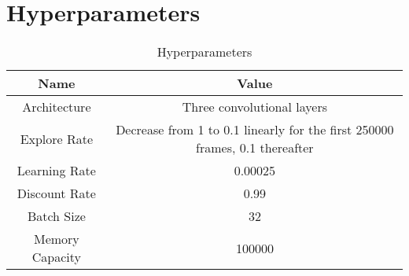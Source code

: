\section{Hyperparameters}
\begin{table}[h!]
\begin{center}
\begin{tabular}{ |c|c| } 
\hline
Name & Value \\
\hline
Architecture & Three convolutional layers\\
\hline
Explore Rate & Decrease from 1 to 0.1 linearly for the first 250000 frames, 0.1 thereafter\\
\hline
Learning Rate & 0.00025\\
\hline
Discount Rate & 0.99 \\
\hline
Batch Size & 32 \\
\hline
Memory Capacity & 100000 \\
\hline
\end{tabular}
\caption{Hyperparameters}
\label{table: hyperparameters}
\end{center}
\end{table}

\endinput
